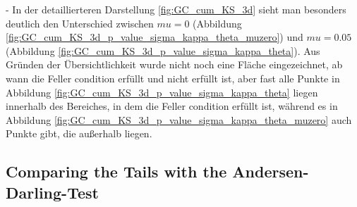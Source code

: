 - In der detaillierteren Darstellung \ref{fig:GC_cum_KS_3d} sieht man besonders deutlich den Unterschied zwischen $mu=0$ (Abbildung \ref{fig:GC_cum_KS_3d_p_value_sigma_kappa_theta_muzero}) und $mu=0.05$ (Abbildung \ref{fig:GC_cum_KS_3d_p_value_sigma_kappa_theta}). Aus Gründen der Übersichtlichkeit wurde nicht noch eine Fläche eingezeichnet, ab wann die Feller condition erfüllt und nicht erfüllt ist, aber fast alle Punkte in Abbildung \ref{fig:GC_cum_KS_3d_p_value_sigma_kappa_theta} liegen innerhalb des Bereiches, in dem die Feller condition erfüllt ist, während es in Abbildung \ref{fig:GC_cum_KS_3d_p_value_sigma_kappa_theta_muzero} auch Punkte gibt, die außerhalb liegen.

\subsection{Comparing the Tails with the Andersen-Darling-Test}